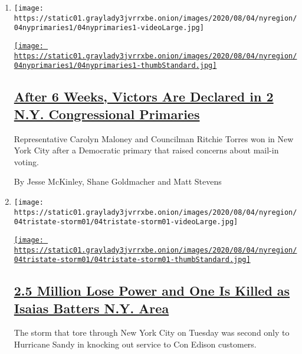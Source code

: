 \begin{enumerate}
\def\labelenumi{\arabic{enumi}.}
\item
  \texttt{[image: https://static01.graylady3jvrrxbe.onion/images/2020/08/04/nyregion/04nyprimaries1/04nyprimaries1-videoLarge.jpg]}

  \href{/2020/08/04/nyregion/maloney-torres-ny-congressional-races.html}{\texttt{[image: https://static01.graylady3jvrrxbe.onion/images/2020/08/04/nyregion/04nyprimaries1/04nyprimaries1-thumbStandard.jpg]}}

  \hypertarget{after-6-weeks-victors-are-declared-in-2-ny-congressional-primaries}{%
  \subsection{\texorpdfstring{\href{/2020/08/04/nyregion/maloney-torres-ny-congressional-races.html}{After
  6 Weeks, Victors Are Declared in 2 N.Y. Congressional
  Primaries}}{After 6 Weeks, Victors Are Declared in 2 N.Y. Congressional Primaries}}\label{after-6-weeks-victors-are-declared-in-2-ny-congressional-primaries}}

  Representative Carolyn Maloney and Councilman Ritchie Torres won in
  New York City after a Democratic primary that raised concerns about
  mail-in voting.

  By Jesse McKinley, Shane Goldmacher and Matt Stevens
\item
  \texttt{[image: https://static01.graylady3jvrrxbe.onion/images/2020/08/04/nyregion/04tristate-storm01/04tristate-storm01-videoLarge.jpg]}

  \href{/2020/08/04/nyregion/isaias-ny.html}{\texttt{[image: https://static01.graylady3jvrrxbe.onion/images/2020/08/04/nyregion/04tristate-storm01/04tristate-storm01-thumbStandard.jpg]}}

  \hypertarget{25-million-lose-power-and-one-is-killed-as-isaias-batters-ny-area}{%
  \subsection{\texorpdfstring{\href{/2020/08/04/nyregion/isaias-ny.html}{2.5
  Million Lose Power and One Is Killed as Isaias Batters N.Y.
  Area}}{2.5 Million Lose Power and One Is Killed as Isaias Batters N.Y. Area}}\label{25-million-lose-power-and-one-is-killed-as-isaias-batters-ny-area}}

  The storm that tore through New York City on Tuesday was second only
  to Hurricane Sandy in knocking out service to Con Edison customers.


\end{enumerate}
